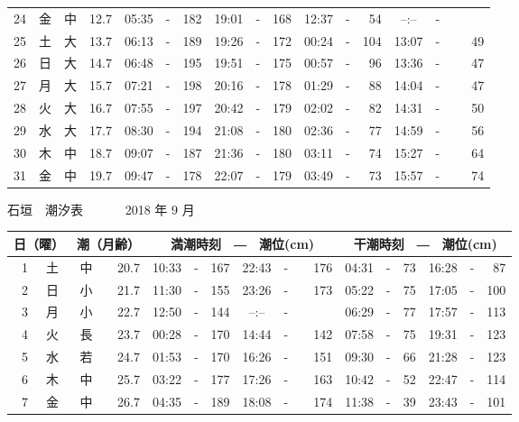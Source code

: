 \documentclass[12pt.a4j]{jsarticle}
\begin{document}
\begin{center}
\begin{table}[ht]
\begin{tabular}{|rc|cr|ccrccr|ccrccr|}
24 & 金 & 中 & 12.7 &  05:35 &-& 182  &  19:01 &-& 168  &   12:37 &-&  54  &   --:-- &-&~~~~~ \\
25 & 土 & 大 & 13.7 &  06:13 &-& 189  &  19:26 &-& 172  &   00:24 &-& 104  &   13:07 &-&  49  \\
26 & 日 & 大 & 14.7 &  06:48 &-& 195  &  19:51 &-& 175  &   00:57 &-&  96  &   13:36 &-&  47  \\
27 & 月 & 大 & 15.7 &  07:21 &-& 198  &  20:16 &-& 178  &   01:29 &-&  88  &   14:04 &-&  47  \\
28 & 火 & 大 & 16.7 &  07:55 &-& 197  &  20:42 &-& 179  &   02:02 &-&  82  &   14:31 &-&  50  \\
29 & 水 & 大 & 17.7 &  08:30 &-& 194  &  21:08 &-& 180  &   02:36 &-&  77  &   14:59 &-&  56  \\
30 & 木 & 中 & 18.7 &  09:07 &-& 187  &  21:36 &-& 180  &   03:11 &-&  74  &   15:27 &-&  64  \\
31 & 金 & 中 & 19.7 &  09:47 &-& 178  &  22:07 &-& 179  &   03:49 &-&  73  &   15:57 &-&  74  \\
   \hline
   \end{tabular}
\end{table}
\newpage
 {\LARGE 石垣　潮汐表　　　}
 {\large 2018 年  9 月}\\
 \begin{table}[ht]
    \begin{tabular}{|rc|cr|ccrccr|ccrccr|}
    \hline
    \multicolumn{2}{|c|}{日（曜）} & \multicolumn{2}{c|}{潮（月齢）} & \multicolumn{6}{c|}{満潮時刻　―　潮位(cm)} & \multicolumn{6}{c|}{干潮時刻　―　潮位(cm)} \\
 \hline
 1 & 土 & 中 & 20.7 &  10:33 &-& 167  &  22:43 &-& 176  &   04:31 &-&  73  &   16:28 &-&  87  \\
 2 & 日 & 小 & 21.7 &  11:30 &-& 155  &  23:26 &-& 173  &   05:22 &-&  75  &   17:05 &-& 100  \\
 3 & 月 & 小 & 22.7 &  12:50 &-& 144  &  --:-- &-&~~~~~ &   06:29 &-&  77  &   17:57 &-& 113  \\
 4 & 火 & 長 & 23.7 &  00:28 &-& 170  &  14:44 &-& 142  &   07:58 &-&  75  &   19:31 &-& 123  \\
 5 & 水 & 若 & 24.7 &  01:53 &-& 170  &  16:26 &-& 151  &   09:30 &-&  66  &   21:28 &-& 123  \\
 6 & 木 & 中 & 25.7 &  03:22 &-& 177  &  17:26 &-& 163  &   10:42 &-&  52  &   22:47 &-& 114  \\
 7 & 金 & 中 & 26.7 &  04:35 &-& 189  &  18:08 &-& 174  &   11:38 &-&  39  &   23:43 &-& 101  \\

\end{tabular}
\end{table}
\end{center}
\end{document}
